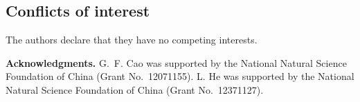 \documentclass[12pt,a4paper]{article}
\theoremstyle{remark}
\begin{document}
\subsection*{Conflicts of interest}
The authors declare that they have no competing interests.

\medskip
\textbf{Acknowledgments.}
G.~F. Cao was supported by the National Natural Science Foundation of China (Grant No.~12071155).
L. He was supported by the National Natural Science Foundation of China (Grant No.~12371127).

\end{document}
